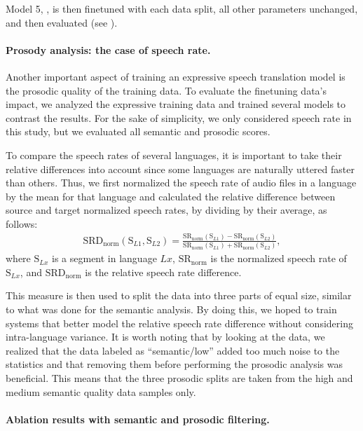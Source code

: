 \noindent Model 5, \seamlessexpressive, is then finetuned with each data split, all other parameters unchanged, and then evaluated (see ).


\paragraph{Prosody analysis: the case of speech rate.}

Another important aspect of training an expressive speech translation model is the prosodic quality of the training data.
To evaluate the finetuning data's impact, we analyzed the expressive training data and trained several models to contrast the results.
For the sake of simplicity, we only considered speech rate in this study, but we evaluated all semantic and prosodic scores.

To compare the speech rates of several languages, it is important to take their relative differences into account since some languages are naturally uttered faster than others.
Thus, we first normalized the speech rate of audio files in a language by the mean for that language and calculated the relative difference between source and target normalized speech rates, by dividing by their average, as follows:
\begin{align}
\textrm{SRD}_\text{norm}(\textrm{S}_{L1}, \textrm{S}_{L2}) = \frac{\textrm{SR}_\text{norm}(\textrm{S}_{L1}) - \textrm{SR}_\text{norm}(\textrm{S}_{L2})}{\textrm{SR}_\text{norm}(\textrm{S}_{L1}) + \textrm{SR}_\text{norm}(\textrm{S}_{L2})},
\end{align}
where $\textrm{S}_{Lx}$ is a segment in language $Lx$, $\textrm{SR}_\text{norm}$ is the normalized speech rate of $\textrm{S}_{Lx}$, and $\textrm{SRD}_\text{norm}$ is the relative speech rate difference.

This measure is then used to split the data into three parts of equal size, similar to what was done for the semantic analysis.
By doing this, we hoped to train systems that better model the relative speech rate difference without considering intra-language variance.
It is worth noting that by looking at the data, we realized that the data labeled as ``semantic/low'' added too much noise to the statistics and that removing them before performing the prosodic analysis was beneficial. 
This means that the three prosodic splits are taken from the high and medium semantic quality data samples only.


\paragraph{Ablation results with semantic and prosodic filtering.}




